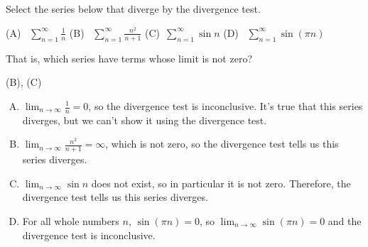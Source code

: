 %
%

\subsection*{\Conceptual}

\begin{Mquestion}
Select the series below that diverge by the divergence test.

\hfill(A)~ $\displaystyle\sum_{n=1}^\infty \frac{1}{n}$ \hfill
\hfill(B)~ $\displaystyle\sum_{n=1}^\infty \frac{n^2}{n+1}$
\hfill (C)~$\displaystyle\sum_{n=1}^\infty \sin n$
\hfill(D)~ $\displaystyle\sum_{n=1}^\infty \sin (\pi n)$\hfill~
\end{Mquestion}
\begin{hint}
That is, which series have terms whose limit is not zero?
\end{hint}
\begin{answer}
(B), (C)
\end{answer}
\begin{solution}
\begin{enumerate}[(A)]
\item $\displaystyle\lim_{n \to \infty}\frac{1}{n}=0$, so the divergence test is inconclusive. It's true that this series diverges, but we can't show it using the divergence test.
\item $\displaystyle\lim_{n \to \infty}\frac{n^2}{n+1}=\infty$, which is not zero, so the divergence test tells us this series diverges.
\item $\displaystyle\lim_{n \to \infty}\sin n$ does not exist, so in particular it is not zero. Therefore, the divergence test tells us this series diverges.
\item For all whole numbers $n$, $\sin(\pi n)=0$, so $\displaystyle\lim_{n \to \infty}\sin(\pi n)=0$ and the divergence test is inconclusive.
\end{enumerate}
\end{solution}

